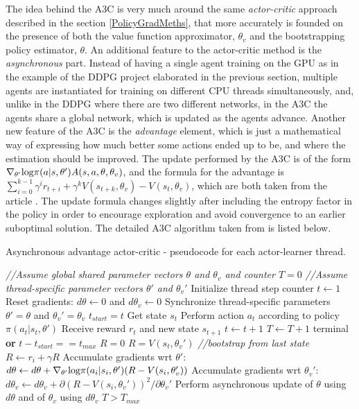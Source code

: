 The idea behind the A3C is very much around the same \textit{actor-critic} approach described in the section \ref{PolicyGradMeths}, that more accurately is founded on the presence of both the value function approximator, $\theta_{v}$ and the bootstrapping policy estimator, $\theta$. An additional feature to the actor-critic method is the \textit{asynchronous} part. Instead of having a single agent training on the GPU as in the example of the DDPG project elaborated in the previous section, multiple agents are instantiated for training on different CPU threads simultaneously, and, unlike in the DDPG where there are two different networks, in the A3C the agents share a global network, which is updated as the agents advance. Another new feature of the A3C is the \textit{advantage} element, which is just a mathematical way of expressing how much better some actions ended up to be, and where the estimation should be improved. The update performed by the A3C is of the form $\nabla_{\theta'}\textup{log}\pi(a|s,\theta')A(s,a,\theta,\theta_{v})$, and the formula for the advantage is $\sum_{i=0}^{k-1}\gamma^{i}r_{t+i}+\gamma^kV(s_{t+k},\theta_{v})-V(s_{t},\theta_{v})$, which are both taken from the article \cite{DBLP:journals/corr/MnihBMGLHSK16}. The update formula changes slightly after including the entropy factor in the policy in order to encourage exploration and avoid convergence to an earlier suboptimal solution. The detailed A3C algorithm taken from \cite{DBLP:journals/corr/MnihBMGLHSK16} is listed below.
\begin{algorithm}[H]
	\caption{Asynchronous advantage actor-critic - pseudocode for each actor-learner thread.}
	\label{algo:A3C}
	\begin{algorithmic}
		\State \textit{//Assume global shared parameter vectors $\theta$ and $\theta_{v}$ and counter $T=0$}
		\State \textit{//Assume thread-specific parameter vectors $\theta'$ and $\theta_{v}'$}
		\State Initialize thread step counter $t\leftarrow1$
		\Repeat
		\State Reset gradients: $d\theta\leftarrow 0$ and $d\theta_{v}\leftarrow0$
		\State Synchronize thread-specific parameters $\theta'=\theta$ and $\theta_{v}'=\theta_{v}$
		\State $t_{start}=t$
		\State Get state $s_{t}$
		\Repeat
		\State Perform action $a_{t}$ according to policy $\pi(a_{t}|s_{t}, \theta')$
		\State Receive reward $r_{t}$ and new state $s_{t+1}$
		\State $t\leftarrow t+1$
		\State $T\leftarrow T+1$
		\Until terminal \textbf{or} $t-t_{start}==t_{max}$
		\State $R=0$
		\Else 
		\State $R=V(s_{t},\theta_{v}')$ \textit{//bootstrap from last state }
		\EndIf
		\State $R\leftarrow r_{i}+\gamma R$
		\State Accumulate gradients wrt $\theta'$:
		\State $d\theta\leftarrow d\theta+\nabla_{\theta'}\textup{log}\pi(a_{i}|s_{i},\theta')(R-V(s_{i},\theta_{v}'))$
		\State Accumulate gradients wrt $\theta_{v}'$:
		\State $d\theta_{v}\leftarrow d\theta_{v} + \partial (R-V(s_{i},\theta_{v}'))^2/ \partial\theta_{v}'$
		\EndFor
		\State Perform asynchronous update of $\theta$ using $d\theta$ and of $\theta_{v}$ using $d\theta_{v}$
		\Until $T>T_{max}$
	\end{algorithmic}
\end{algorithm}

